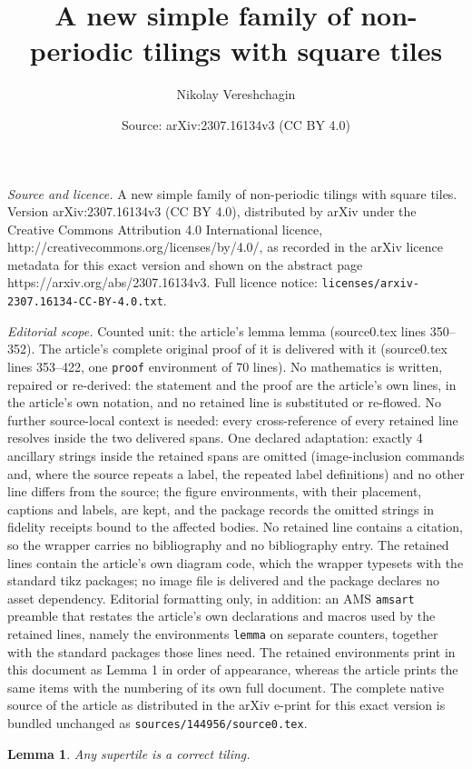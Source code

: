 \documentclass[10pt,a4paper]{amsart}
\title{A new simple family of non-periodic tilings with square tiles}
\author{Nikolay Vereshchagin}
\date{Source: arXiv:2307.16134v3 (CC BY 4.0)}
\newtheorem{lemma}{Lemma}
\begin{document}
\maketitle

\noindent\emph{Source and licence.} A new simple family of non-periodic tilings with square tiles. Version arXiv:2307.16134v3 (CC BY 4.0), distributed by arXiv under the Creative Commons Attribution 4.0 International licence, http://creativecommons.org/licenses/by/4.0/, as recorded in the arXiv licence metadata for this exact version and shown on the abstract page https://arxiv.org/abs/2307.16134v3. Full licence notice: \texttt{licenses/arxiv-2307.16134-CC-BY-4.0.txt}.\par\smallskip

\noindent\textit{Editorial scope.} Counted unit: the article's lemma lemma (source0.tex lines 350--352). The article's complete original proof of it is delivered with it (source0.tex lines 353--422, one \texttt{proof} environment of 70 lines). No mathematics is written, repaired or re-derived: the statement and the proof are the article's own lines, in the article's own notation, and no retained line is substituted or re-flowed.  No further source-local context is needed: every cross-reference of every retained line resolves inside the two delivered spans.  One declared adaptation: exactly 4 ancillary strings inside the retained spans are omitted (image-inclusion commands and, where the source repeats a label, the repeated label definitions) and no other line differs from the source; the figure environments, with their placement, captions and labels, are kept, and the package records the omitted strings in fidelity receipts bound to the affected bodies.  No retained line contains a citation, so the wrapper carries no bibliography and no bibliography entry.  The retained lines contain the article's own diagram code, which the wrapper typesets with the standard tikz packages; no image file is delivered and the package declares no asset dependency.  Editorial formatting only, in addition: an AMS \texttt{amsart} preamble that restates the article's own declarations and macros used by the retained lines, namely the environments \texttt{lemma} on separate counters, together with the standard packages those lines need.  The retained environments print in this document as Lemma 1 in order of appearance, whereas the article prints the same items with the numbering of its own full document.  The complete native source of the article as distributed in the arXiv e-print for this exact version is bundled unchanged as \texttt{sources/144956/source0.tex}.
\begin{lemma}
Any supertile is a correct tiling.
\end{lemma}
\end{document}
